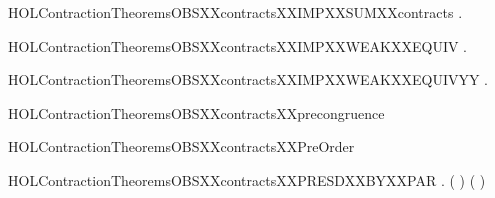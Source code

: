 \begin{SaveVerbatim}{HOLContractionTheoremsOBSXXcontractsXXIMPXXSUMXXcontracts}
\HOLTokenTurnstile{} \HOLSymConst{\HOLTokenForall{}} .    \HOLSymConst{\HOLTokenImp{}}   
\end{SaveVerbatim}
\newcommand{\HOLContractionTheoremsOBSXXcontractsXXIMPXXSUMXXcontracts}{\UseVerbatim{HOLContractionTheoremsOBSXXcontractsXXIMPXXSUMXXcontracts}}
\begin{SaveVerbatim}{HOLContractionTheoremsOBSXXcontractsXXIMPXXWEAKXXEQUIV}
\HOLTokenTurnstile{} \HOLSymConst{\HOLTokenForall{}} .    \HOLSymConst{\HOLTokenImp{}}   
\end{SaveVerbatim}
\newcommand{\HOLContractionTheoremsOBSXXcontractsXXIMPXXWEAKXXEQUIV}{\UseVerbatim{HOLContractionTheoremsOBSXXcontractsXXIMPXXWEAKXXEQUIV}}
\begin{SaveVerbatim}{HOLContractionTheoremsOBSXXcontractsXXIMPXXWEAKXXEQUIVYY}
\HOLTokenTurnstile{} \HOLSymConst{\HOLTokenForall{}} .    \HOLSymConst{\HOLTokenImp{}}   
\end{SaveVerbatim}
\newcommand{\HOLContractionTheoremsOBSXXcontractsXXIMPXXWEAKXXEQUIVYY}{\UseVerbatim{HOLContractionTheoremsOBSXXcontractsXXIMPXXWEAKXXEQUIVYY}}
\begin{SaveVerbatim}{HOLContractionTheoremsOBSXXcontractsXXprecongruence}
\HOLTokenTurnstile{}  
\end{SaveVerbatim}
\newcommand{\HOLContractionTheoremsOBSXXcontractsXXprecongruence}{\UseVerbatim{HOLContractionTheoremsOBSXXcontractsXXprecongruence}}
\begin{SaveVerbatim}{HOLContractionTheoremsOBSXXcontractsXXPreOrder}
\HOLTokenTurnstile{}  
\end{SaveVerbatim}
\newcommand{\HOLContractionTheoremsOBSXXcontractsXXPreOrder}{\UseVerbatim{HOLContractionTheoremsOBSXXcontractsXXPreOrder}}
\begin{SaveVerbatim}{HOLContractionTheoremsOBSXXcontractsXXPRESDXXBYXXPAR}
\HOLTokenTurnstile{} \HOLSymConst{\HOLTokenForall{}}   .
          \HOLSymConst{\HOLTokenConj{}}    \HOLSymConst{\HOLTokenImp{}}
        ( \HOLSymConst{\ensuremath{\parallel}} ) ( \HOLSymConst{\ensuremath{\parallel}} )
\end{SaveVerbatim}
